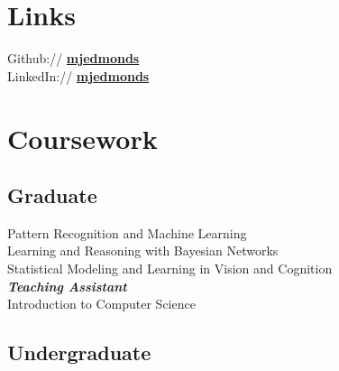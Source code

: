 \documentclass[letterpaper]{deedy-resume} %
\begin{document}
\begin{minipage}[t]{0.27\textwidth}
\sectionspace %






\section{Links} 

Github:// \href{https://github.com/mjedmonds}{\bf mjedmonds} \\
LinkedIn:// \href{https://www.linkedin.com/in/mjedmonds}{\bf mjedmonds} \\

\sectionspace %


\section{Coursework}

\subsection{Graduate}

Pattern Recognition and Machine Learning\\
Learning and Reasoning with Bayesian Networks\\
Statistical Modeling and Learning in Vision and Cognition\\
{\footnotesize \textit{\textbf{Teaching Assistant}}} \\
Introduction to Computer Science

\sectionspace %


\subsection{Undergraduate}


\end{minipage}
\end{document}

